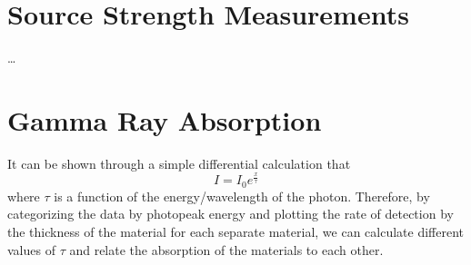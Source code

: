 \documentclass[12pt, a4paper]{article}
\begin{document}
\section{Source Strength Measurements}
	\dots

\section{Gamma Ray Absorption}
	It can be shown through a simple differential calculation that
	\begin{equation}
		I = I_0 e^{\frac{x}{\tau}}
	\end{equation}
	where $\tau$ is a function of the energy/wavelength of the photon. Therefore, by categorizing the data by photopeak energy and plotting the rate of detection by the thickness of the material for each separate material, we can calculate different values of $\tau$ and relate the absorption of the materials to each other.
\end{document}
